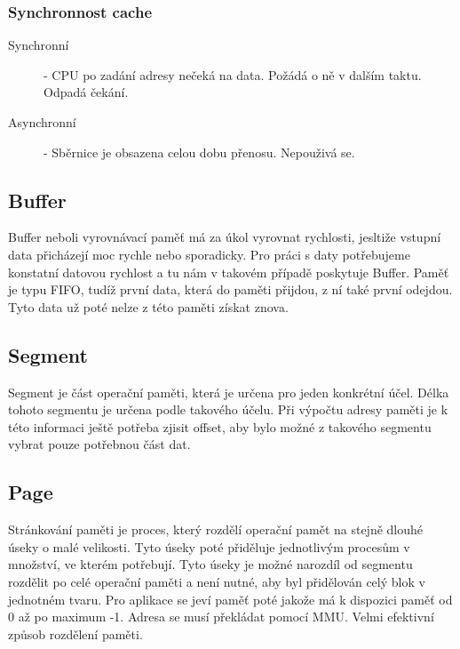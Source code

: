 \subsubsection{Synchronnost cache}
\begin{description}
  \item[Synchronní]- CPU po zadání adresy nečeká na data. Požádá o ně v dalším taktu. Odpadá čekání.
  \item[Asynchronní]-  Sběrnice je obsazena celou dobu přenosu. Nepouživá se.
\end{description}
\subsection{Buffer}
Buffer neboli vyrovnávací paměť má za úkol vyrovnat rychlosti, jesltiže vstupní data přicházejí moc rychle nebo sporadicky.
Pro práci s daty potřebujeme konstatní datovou rychlost a tu nám v takovém případě poskytuje Buffer.
Paměť je typu FIFO, tudíž první data, která do paměti přijdou, z ní také první odejdou.
Tyto data už poté nelze z této paměti získat znova.
\subsection{Segment}
Segment je část operační paměti, která je určena pro jeden konkrétní účel.
Délka tohoto segmentu je určena podle takového účelu.
Při výpočtu adresy paměti je k této informaci ještě potřeba zjisit offset, aby bylo možné z takového segmentu vybrat pouze potřebnou část dat.
\subsection{Page}
Stránkování paměti je proces, který rozdělí operační pamět na stejně dlouhé úseky o malé velikosti.
Tyto úseky poté přiděluje jednotlivým procesům v množství, ve kterém potřebují.
Tyto úseky je možné narozdíl od segmentu rozdělit po celé operační paměti a není nutné, aby byl přidělován celý blok v jednotném tvaru.
Pro aplikace se jeví paměť poté jakože má k dispozici paměť od 0 až po maximum -1.
Adresa se musí překládat pomocí MMU.
Velmi efektivní způsob rozdělení paměti.

